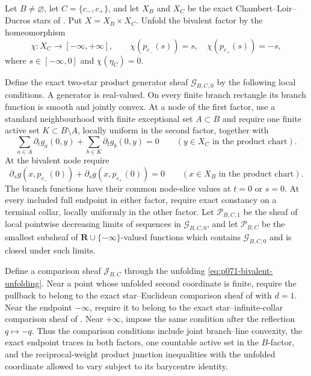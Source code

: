 
\begin{theorem}
\label{thm:p071-bivalent-star-product-collapse}
Let $B\ne\varnothing$, let $C=\{c_-,c_+\}$, and let $X_B$ and $X_C$ be
the exact Chambert--Loir--Ducros stars of
.  Put
$X=X_B\times X_C$.  Unfold the bivalent factor by the homeomorphism
\begin{equation}
 \chi:X_C\longrightarrow[-\infty,+\infty],\qquad
 \chi(p_{c_-}(s))=s,\quad
 \chi(p_{c_+}(s))=-s,
 \label{eq:p071-bivalent-unfolding}
\end{equation}
where $s\in[-\infty,0]$ and $\chi(\eta_C)=0$.

Define the exact two-star product generator sheaf
$\mathcal G_{B,C,0}$ by the following local conditions.  A generator is
real-valued.  On every finite branch rectangle its branch function is
smooth and jointly convex.  At a node of the first factor, use a standard
neighbourhood with finite exceptional set $A\subset B$ and require one
finite active set $K\subset B\setminus A$, locally uniform in the second
factor, together with
\begin{equation}
 \sum_{a\in A}\partial_tg_a(0,y)
   +\sum_{b\in K}\partial_tg_b(0,y)=0
 \qquad(y\in X_C\text{ in the product chart}).
 \label{eq:p071-bivalent-first-balance}
\end{equation}
At the bivalent node require
\begin{equation}
 \partial_sg(x,p_{c_-}(0))
   +\partial_sg(x,p_{c_+}(0))=0
 \qquad(x\in X_B\text{ in the product chart}).
 \label{eq:p071-bivalent-second-balance}
\end{equation}
The branch functions have their common node-slice values at $t=0$ or
$s=0$.  At every included full endpoint in either factor, require exact
constancy on a terminal collar, locally uniformly in the other factor.
Let $\mathcal P_{B,C,1}$ be the sheaf of local pointwise decreasing
limits of sequences in $\mathcal G_{B,C,0}$, and let
$\mathcal P_{B,C}$ be the smallest subsheaf of
$\mathbf R\cup\{-\infty\}$-valued functions which contains
$\mathcal G_{B,C,0}$ and is closed under such limits.

Define a comparison sheaf $\mathcal J_{B,C}$ through the unfolding
\eqref{eq:p071-bivalent-unfolding}.  Near a point whose unfolded second
coordinate is finite, require the pullback to belong to the exact
star--Euclidean comparison sheaf of
 with $d=1$.  Near the
endpoint $-\infty$, require it to belong to the exact star--infinite-collar
comparison sheaf of
.  Near
$+\infty$, impose the same condition after the reflection $q\mapsto-q$.
Thus the comparison conditions include joint branch--line convexity, the
exact endpoint traces in both factors, one countable active set in the
$B$-factor, and the reciprocal-weight product junction inequalities with
the unfolded coordinate allowed to vary subject to its barycentre
identity.


\end{theorem}

